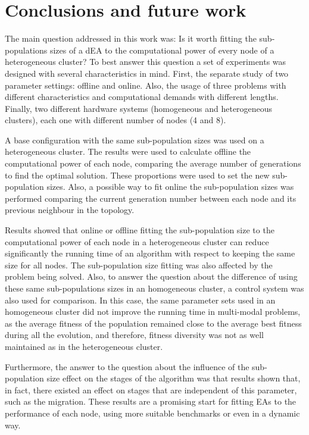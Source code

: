 \documentclass[final,1p,times]{elsarticle}
\begin{document}
\section{Conclusions and future work}



The main question addressed in this work was: Is it worth fitting the 
sub-populations sizes of a dEA to the computational power of every node 
of a heterogeneous cluster? To best answer this question a set of 
experiments was designed with several characteristics in mind. 
First, the separate study of two parameter settings: offline and 
online. Also, the usage of three problems with different characteristics and 
computational demands with different lengths. Finally, two different hardware 
systems (homogeneous and heterogeneous clusters),  each one with different number
 of nodes (4 and 8).

A base configuration with the same sub-population sizes was used on a heterogeneous cluster. The results were used to calculate offline the computational power of each node, comparing the average number of generations to find the optimal solution. These proportions were used to set the new sub-population sizes. Also, a possible way to fit online the sub-population sizes was performed comparing the current generation number between each node and its previous neighbour in the topology. 

Results showed that online or offline fitting the sub-population size to the computational power of each node in a heterogeneous cluster
can reduce significantly the running time of an algorithm with respect
to keeping the same size for all nodes. The sub-population size fitting was also affected by the problem being solved. Also, to answer the question about the difference of using these same sub-populations sizes in an homogeneous cluster, a control system was also used for comparison. In this case, the same parameter sets used in an homogeneous cluster did not improve the running time in multi-modal problems, as the average fitness of the population remained close to the average best fitness during all the evolution, and therefore, fitness diversity was not as well maintained as in the heterogeneous cluster.



Furthermore, the answer to the question about the influence of the sub-population size effect on the stages
of the algorithm was that results shown that, in fact, there existed an effect on stages that are independent of this parameter, such as
the migration.  These results are a promising start for fitting EAs to the performance of each  node, using more suitable benchmarks or even in a dynamic way. 
\end{document}
